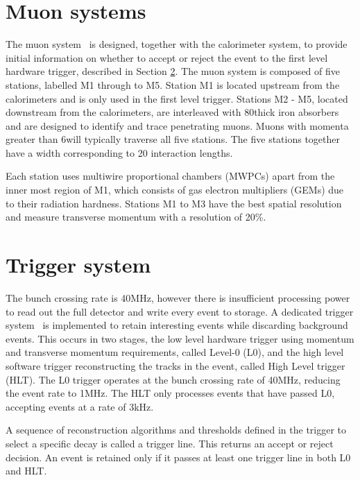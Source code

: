 \section{Muon systems}
\label{sec:detector:muon}

The muon system~\cite{LHCb-DP-2013-001,LHCb-DP-2012-002} is designed, together with the calorimeter system, to provide initial information on whether to accept or reject the event to the first level hardware trigger, described in Section \ref{sec:detector:trigger}. The muon system is composed of five stations, labelled M1 through to M5. Station M1 is located upstream from the calorimeters and is only used in the first level trigger. Stations M2 - M5, located downstream from the calorimeters, are interleaved with 80\cm thick iron absorbers and are designed to identify and trace penetrating muons. Muons with momenta greater than 6\gevc will typically traverse all five stations. The five stations together have a width corresponding to 20 interaction lengths. 

Each station uses multiwire proportional chambers (MWPCs) apart from the inner most region of M1, which consists of gas electron multipliers (GEMs) due to their radiation hardness. Stations M1 to M3 have the best spatial resolution and measure transverse momentum with a resolution of 20\%.

\section{Trigger system}
\label{sec:detector:trigger}

The \lhc bunch crossing rate is 40MHz, however there is insufficient processing power to read out the full detector and write every event to storage. A dedicated trigger system~\cite{LHCb-DP-2012-004} is implemented to retain interesting events while discarding background events. This occurs in two stages, the low level hardware trigger  using momentum and transverse momentum requirements, called Level-0 (L0), and the high level software trigger reconstructing the tracks in the event, called High Level trigger (HLT). The L0 trigger operates at the bunch crossing rate of 40MHz, reducing the event rate to 1MHz. The HLT only processes events that have passed L0, accepting events at a rate of 3kHz.

A sequence of reconstruction algorithms and thresholds defined in the trigger to select a specific decay is called a trigger line. This returns an accept or reject decision. An event is retained only if it passes at least one trigger line in both L0 and HLT.

